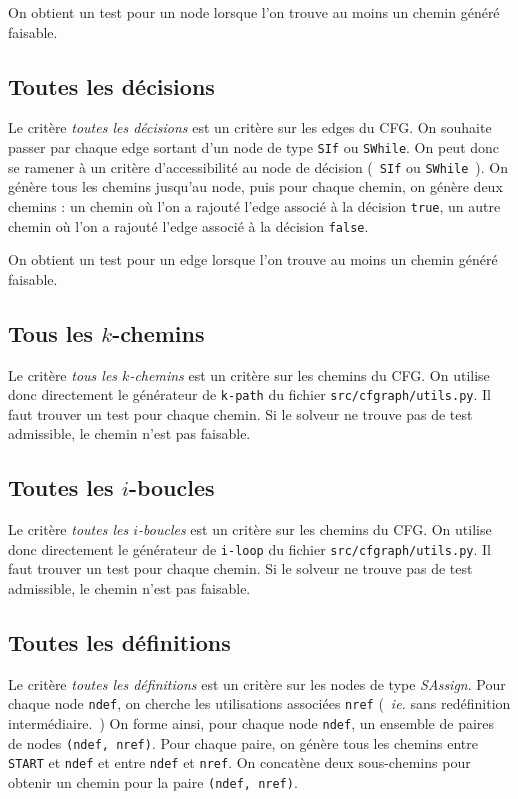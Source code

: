 On obtient un test pour un node lorsque l'on trouve au moins un chemin généré
faisable.

\subsection{Toutes les décisions}

Le critère \textit{toutes les décisions} est un critère sur les edges du CFG.
On souhaite passer par chaque edge sortant d'un node de type \texttt{SIf} ou
\texttt{SWhile}. On peut donc se ramener à un critère d'accessibilité au node
de décision (~\texttt{SIf} ou \texttt{SWhile}~). On génère tous les chemins
jusqu'au node, puis pour chaque chemin, on génère deux chemins : un chemin où
l'on a rajouté l'edge associé à la décision \texttt{true}, un autre chemin où
l'on a rajouté l'edge associé à la décision \texttt{false}.

On obtient un test pour un edge lorsque l'on trouve au moins un chemin généré
faisable.

\subsection{Tous les $k$-chemins}

Le critère \textit{tous les $k$-chemins} est un critère sur les chemins du CFG.
On utilise donc directement le générateur de \texttt{k-path} du fichier
\texttt{src/cfgraph/utils.py}. Il faut trouver un test pour chaque chemin. Si
le solveur ne trouve pas de test admissible, le chemin n'est pas faisable.

\subsection{Toutes les $i$-boucles}

Le critère \textit{toutes les $i$-boucles} est un critère sur les chemins du CFG.
On utilise donc directement le générateur de \texttt{i-loop} du fichier
\texttt{src/cfgraph/utils.py}. Il faut trouver un test pour chaque chemin. Si
le solveur ne trouve pas de test admissible, le chemin n'est pas faisable.

\subsection{Toutes les définitions}

Le critère \textit{toutes les définitions} est un critère sur les nodes de type
\textit{SAssign}. Pour chaque node \texttt{ndef}, on cherche les utilisations
associées \texttt{nref} (~\textit{ie.} sans redéfinition intermédiaire.~) On
forme ainsi, pour chaque node \texttt{ndef}, un ensemble de paires de nodes
\texttt{(ndef, nref)}. Pour chaque paire, on génère tous les chemins entre
\texttt{START} et \texttt{ndef} et entre \texttt{ndef} et \texttt{nref}. On
concatène deux sous-chemins pour obtenir un chemin pour la paire
\texttt{(ndef, nref)}.

